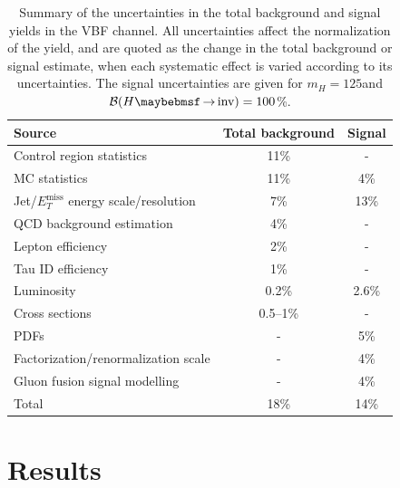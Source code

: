 \begin{table}[!htb]
\centering
\begin{tabular}{|l|c|c|}
\hline
Source                              & Total background & Signal \\
\hline\hline
Control region statistics           & 11\%             & -      \\
MC statistics                       & 11\%             & 4\%    \\
Jet/$E_T^{\text{miss}}$ energy scale/resolution   & 7\%              & 13\%   \\
QCD background estimation           & 4\%              & -      \\
Lepton efficiency                   & 2\%              & -      \\
Tau ID efficiency                   & 1\%              & -      \\
Luminosity                          & 0.2\%            & 2.6\%  \\
Cross sections                      & 0.5--1\%         & -      \\
PDFs                                & -                & 5\%    \\
Factorization/renormalization scale & -                & 4\%    \\
Gluon fusion signal modelling       & -                & 4\%    \\
\hline\hline
Total                               & 18\%             & 14\%   \\
\hline 
\end{tabular}
\caption{Summary of the uncertainties in the total background and signal yields in the VBF channel. All uncertainties affect the normalization of the yield, and are quoted as the change in the total background or signal estimate, when each systematic effect is varied according to its uncertainties. The signal uncertainties are given for $m_H=125$\GeV and $\BRinv=100$\%. \cite{ARTICLE:CMSVBFHiggsToInvAndZHCombination}}
\label{TABLE:PromptDataAnalysis_SourcesUncertaintySummary}
\end{table}


\section{Results}

